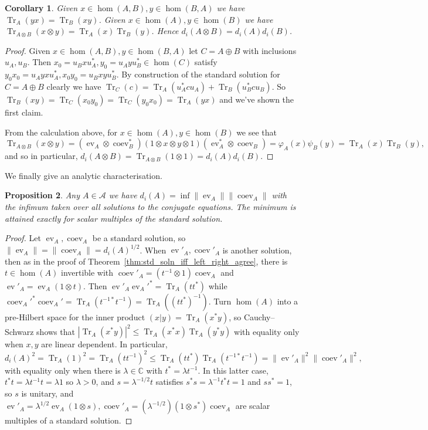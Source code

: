 \documentclass[a4paper,11pt]{article}
\theoremstyle{plain}
\newtheorem{proposition}{Proposition}[section]
\newtheorem{corollary}[proposition]{Corollary}
\theoremstyle{remark}
\newcommand{\mc}[1]{\mathcal{#1}}
\newcommand{\Tr}{{\operatorname{Tr}}}
\newcommand{\ev}{\operatorname{ev}}
\newcommand{\coev}{\operatorname{coev}}
\newcommand{\tr}{\operatorname{Tr}}
\begin{document}
\begin{corollary}\label{corr:cat_trace_properties}
Given $x\in\hom(A,B), y\in\hom(B,A)$ we have $\tr_A(yx) = \tr_B(xy)$.  Given $x\in\hom(A), y\in\hom(B)$ we have $\tr_{A\otimes B}(x\otimes y) = \tr_A(x) \tr_B(y)$.  Hence $d_i(A\otimes B) = d_i(A) d_i(B)$.
\end{corollary}
\begin{proof}
Given $x\in\hom(A,B), y\in\hom(B,A)$ let $C = A\oplus B$ with inclusions $u_A, u_B$.  Then $x_0 = u_B x u_A^*, y_0 = u_A y u_B^* \in \hom(C)$ satisfy $y_0 x_0 = u_A yx u_A^*, x_0 y_0 = u_B xy u_B^*$.  By construction of the standard solution for $C = A \oplus B$ clearly we have $\tr_C(c) = \tr_A(u_A^* c u_A) + \tr_B(u_B^* c u_B)$.  So $\tr_B(xy) = \tr_C(x_0y_0) = \tr_C(y_0x_0) = \tr_A(yx)$ and we've shown the first claim.

From the calculation above, for $x\in\hom(A), y\in\hom(B)$ we see that
\[ \tr_{A\otimes B}(x\otimes y) = (\ev_A \otimes \coev_B^*) (1\otimes x\otimes y\otimes 1)(\ev_A^* \otimes \coev_B)
= \varphi_A(x) \psi_B(y) = \tr_A(x) \tr_B(y), \]
and so in particular, $d_i(A\otimes B) = \Tr_{A\otimes B}(1\otimes1) = d_i(A) d_i(B)$.
\end{proof}

We finally give an analytic characterisation.

\begin{proposition}
Any $A\in\mc A$ we have $d_i(A) = \inf \|\ev_A\| \|\coev_A\|$ with the infimum taken over all solutions to the conjugate equations.  The minimum is attained exactly for scalar multiples of the standard solution.
\end{proposition}
\begin{proof}
Let $\ev_A, \coev_A$ be a standard solution, so $\|\ev_A\| = \|\coev_A\| = d_i(A)^{1/2}$.  When $\ev'_A, \coev'_A$ is another solution, then as in the proof of Theorem~\ref{thm:std_soln_iff_left_right_agree}, there is $t\in\hom(A)$ invertible with $\coev'_A = (t^{-1}\otimes 1)\coev_A$ and $\ev'_A = \ev_A(1\otimes t)$.  Then $\ev'_A \ev_A'^* = \tr_A(tt^*)$ while $\coev_A'^* \coev_A' = \tr_A(t^{-1*}t^{-1}) = \tr_A((tt^*)^{-1})$.  Turn $\hom(A)$ into a pre-Hilbert space for the inner product $(x|y) = \tr_A(x^*y)$, so Cauchy--Schwarz shows that $|\tr_A(x^*y)|^2 \leq \tr_A(x^*x) \tr_A(y^*y)$ with equality only when $x,y$ are linear dependent.  In particular,
\[ d_i(A)^2 = \tr_A(1)^2 = \tr_A(tt^{-1})^2 \leq \tr_A(tt^*) \tr_A(t^{-1*}t^{-1})
= \|\ev'_A\|^2 \|\coev'_A\|^2, \]
with equality only when there is $\lambda\in\mathbb C$ with $t^* = \lambda t^{-1}$.  In this latter case, $t^*t = \lambda t^{-1}t = \lambda 1$ so $\lambda > 0$, and $s = \lambda^{-1/2}t$ satisfies $s^*s = \lambda^{-1} t^*t = 1$ and $ss^* = 1$, so $s$ is unitary, and $\ev'_A = \lambda^{1/2} \ev_A(1\otimes s), \coev'_A = (\lambda^{-1/2})(1\otimes s^*)\coev_A$ are scalar multiples of a standard solution.
\end{proof}
\end{document}
